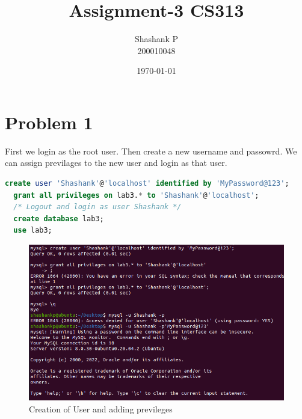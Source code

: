 \documentclass{article}
\title{Assignment-3 CS313}
\author{Shashank P \\ 200010048}
\date{\today}
\begin{document}
\maketitle




\section{Problem 1}
First we login as the root user. Then create a new username and passowrd.
We can assign previlages to the new user and login as that user.
\begin{lstlisting}[language=sql]
  create user 'Shashank'@'localhost' identified by 'MyPassword@123';
  grant all privileges on lab3.* to 'Shashank'@'localhost';
  /* Logout and login as user Shashank */
  create database lab3;
  use lab3;
\end{lstlisting}
\begin{figure}[!ht]
  \begin{center}
  \includegraphics[scale=0.8]{new_user_1.png}
  \caption{Creation of User and adding previleges}
  \end{center}
\end{figure}
\end{document}
